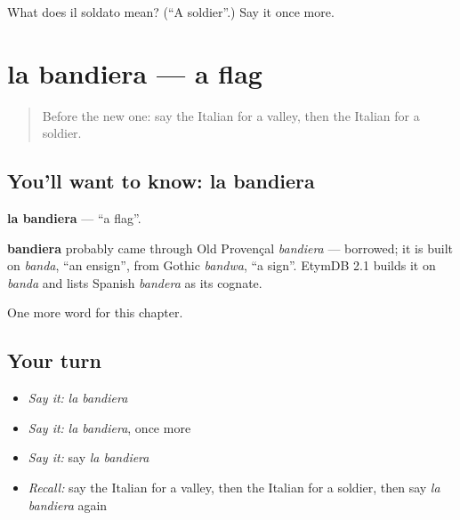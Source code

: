 \begin{tcolorbox}[breakable,colback=teal!4,colframe=teal!35!black,title={Before you move on}]
What does il soldato mean? (\textquotedblleft{}A soldier\textquotedblright{}.) Say it once more.
\end{tcolorbox}
\section[la bandiera]{la bandiera — a flag}

\label{lesson:IT-C222-bandiera}



\begin{quote}
Before the new one: say the Italian for a valley, then the Italian for a soldier.
\end{quote}

\subsection*{You'll want to know: la bandiera}
\textbf{la bandiera} — \textquotedblleft{}a flag\textquotedblright{}.

\begin{cousinweb}
\textbf{bandiera} probably came through Old Provençal \emph{bandiera} — borrowed; it is built on \emph{banda}, \textquotedblleft{}an ensign\textquotedblright{}, from Gothic \emph{bandwa}, \textquotedblleft{}a sign\textquotedblright{}. EtymDB 2.1 builds it on \emph{banda} and lists Spanish \emph{bandera} as its cognate.
\end{cousinweb}

\begin{grammarlens}[title={What you've built}]
One more word for this chapter.
\end{grammarlens}

\subsection*{Your turn}
\begin{itemize}
\raggedright
  \item \emph{Say it:} \emph{la bandiera}
  \item \emph{Say it:} \emph{la bandiera}, once more
  \item \emph{Say it:} say \emph{la bandiera}
  \item \emph{Recall:} say the Italian for a valley, then the Italian for a soldier, then say \emph{la bandiera} again
\end{itemize}

